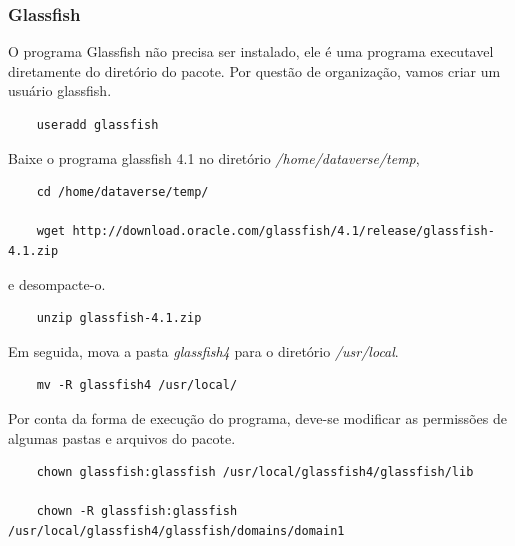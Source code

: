 \documentclass[12pt,hidelinks]{article}
\begin{document}
        \subsubsection{Glassfish}
        
        \qquad O programa Glassfish não precisa ser instalado, ele é uma programa executavel diretamente do diretório do pacote. Por questão de organização, vamos criar um usuário glassfish.
        \begin{verbatim}
    useradd glassfish
        \end{verbatim}
        
        Baixe o programa glassfish 4.1 no diretório \textit{/home/dataverse/temp},
        \begin{verbatim}
    cd /home/dataverse/temp/
    
    wget http://download.oracle.com/glassfish/4.1/release/glassfish-4.1.zip
        \end{verbatim}
        e desompacte-o.
        \begin{verbatim}
    unzip glassfish-4.1.zip
        \end{verbatim}  
        
        Em seguida, mova a pasta \textit{glassfish4} para o diretório \textit{/usr/local}.
        \begin{verbatim}
    mv -R glassfish4 /usr/local/
        \end{verbatim}
        Por conta da forma de execução do programa, deve-se modificar as permissões de algumas pastas e arquivos do pacote.
        \begin{verbatim}
    chown glassfish:glassfish /usr/local/glassfish4/glassfish/lib
    
    chown -R glassfish:glassfish /usr/local/glassfish4/glassfish/domains/domain1
        \end{verbatim}
        
\end{document}
